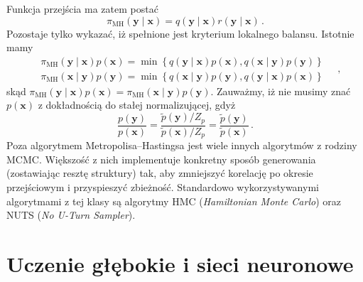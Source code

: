 \documentclass{myclass}
\numberwithin{equation}{subsection}
\begin{document}
Funkcja przejścia ma zatem postać
\begin{equation}
    \pi_\text{MH}(\bm{y}\mid\bm{x}) = q(\bm{y} \mid \bm{x}) r(\bm{y} \mid \bm{x})\,.
\end{equation}
Pozostaje tylko wykazać, iż spełnione jest kryterium lokalnego balansu. Istotnie mamy
\begin{equation}
    \begin{split}
        &\pi_\text{MH}(\bm{y}\mid\bm{x})p(\bm{x}) = \min\left\{q(\bm{y}\mid\bm{x})p(\bm{x}), q(\bm{x}\mid\bm{y})p(\bm{y})\right\}\\
        &\pi_\text{MH}(\bm{x}\mid\bm{y})p(\bm{y}) = \min\left\{q(\bm{x}\mid\bm{y})p(\bm{y}), q(\bm{y}\mid\bm{x})p(\bm{x})\right\}
    \end{split}\quad,
\end{equation}
skąd \(\pi_\text{MH}(\bm{y}\mid\bm{x})p(\bm{x}) = \pi_\text{MH}(\bm{x}\mid\bm{y})p(\bm{y})\).
Zauważmy, iż nie musimy znać \(p(\bm{x})\) z dokładnością do stałej normalizującej, gdyż
\begin{equation}
    \frac{p(\bm{y})}{p(\bm{x})} = \frac{\tilde{p}(\bm{y})/Z_p}{\tilde{p}(\bm{x})/Z_p} =  \frac{\tilde{p}(\bm{y})}{\tilde{p}(\bm{x})}\,.
\end{equation}
Poza algorytmem Metropolisa--Hastingsa jest wiele innych algorytmów z rodziny MCMC. Większość z nich
implementuje konkretny sposób generowania (zostawiając resztę struktury) tak, aby zmniejszyć
korelację po okresie przejściowym i przyspieszyć zbieżność. Standardowo wykorzystywanymi algorytmami
z tej klasy są algorytmy HMC (\textit{Hamiltonian Monte Carlo}) oraz NUTS (\textit{No U-Turn
Sampler}).


\section{Uczenie głębokie i sieci neuronowe}










    
\end{document}
